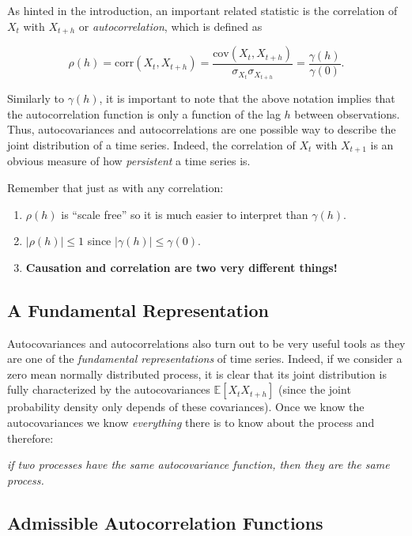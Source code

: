 \documentclass[]{book}
\providecommand{\tightlist}{%
  \setlength{\itemsep}{0pt}\setlength{\parskip}{0pt}}
\theoremstyle{definition}
\theoremstyle{definition}
\theoremstyle{definition}
\theoremstyle{remark}
\begin{document}
As hinted in the introduction, an important related statistic is the
correlation of \(X_t\) with \(X_{t+h}\) or \emph{autocorrelation}, which
is defined as

\[\rho \left(  h \right) = \text{corr}\left( {{X_t},{X_{t + h}}} \right) = \frac{{\text{cov}\left( {{X_t},{X_{t + h}}} \right)}}{{{\sigma _{{X_t}}}{\sigma _{{X_{t + h}}}}}} = \frac{\gamma(h) }{\gamma(0)}.\]

Similarly to \(\gamma(h)\), it is important to note that the above
notation implies that the autocorrelation function is only a function of
the lag \(h\) between observations. Thus, autocovariances and
autocorrelations are one possible way to describe the joint distribution
of a time series. Indeed, the correlation of \(X_t\) with \(X_{t+1}\) is
an obvious measure of how \emph{persistent} a time series is.

Remember that just as with any correlation:

\begin{enumerate}
\def\labelenumi{\arabic{enumi}.}
\tightlist
\item
  \(\rho \left( h \right)\) is ``scale free'' so it is much easier to
  interpret than \(\gamma(h)\).
\item
  \(|\rho \left( h \right)| \leq 1\) since
  \(|\gamma(h)| \leq \gamma(0)\).
\item
  \textbf{Causation and correlation are two very different things!}
\end{enumerate}

\hypertarget{a-fundamental-representation}{%
\subsection{A Fundamental
Representation}\label{a-fundamental-representation}}

Autocovariances and autocorrelations also turn out to be very useful
tools as they are one of the \emph{fundamental representations} of time
series. Indeed, if we consider a zero mean normally distributed process,
it is clear that its joint distribution is fully characterized by the
autocovariances \(\mathbb{E}[X_t X_{t+h}]\) (since the joint probability
density only depends of these covariances). Once we know the
autocovariances we know \emph{everything} there is to know about the
process and therefore:

\emph{if two processes have the same autocovariance function, then they
are the same process.}

\hypertarget{admissible-autocorrelation-functions}{%
\subsection{Admissible Autocorrelation
Functions}\label{admissible-autocorrelation-functions}}
\end{document}
